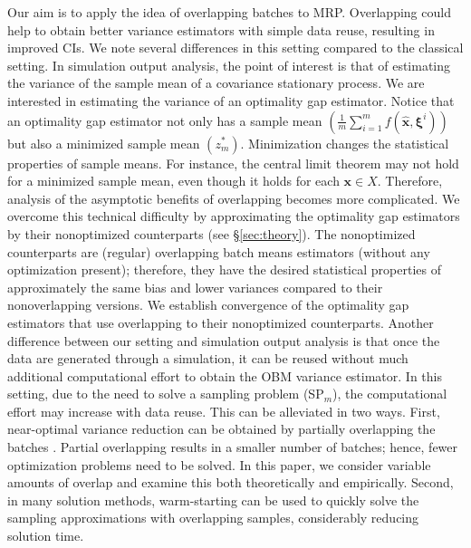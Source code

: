 \documentclass[12pt]{article}
\newcommand{\X}{X}
\newcommand{\x}{\mathbf{x}}
\newcommand{\xh}{{\hat{\x}}}
\newcommand{\xit}{\boldsymbol{\xi}}
\newcommand{\xiti}{\xit^i}
\newcommand{\zs}{z^*}
\begin{document}
Our aim is to apply the idea of overlapping batches to MRP.  
Overlapping could help to obtain better variance estimators with simple data reuse, resulting in improved CIs.
We note several differences in this setting compared to the classical setting.  
In simulation output analysis, the point of interest is that of estimating the variance of the sample mean of a covariance stationary process.  
We are interested in estimating the variance of an optimality gap estimator.  
Notice that an optimality gap estimator not only has a sample mean $(\frac{1}{m} \sum_{i=1}^m f(\xh,\xiti))$ but also a minimized sample mean $(\zs_m)$.  
Minimization changes the statistical properties of sample means.  
For instance, the central limit theorem may not hold for a minimized sample mean, even though it holds for each $\x \in \X$.  
Therefore, analysis of the asymptotic benefits of overlapping becomes more complicated.
We overcome this technical difficulty by approximating the optimality gap estimators by their nonoptimized counterparts (see \S \ref{sec:theory}).  
The nonoptimized counterparts are (regular) overlapping batch means estimators (without any optimization present); therefore, they have the desired statistical properties of approximately the same bias and lower variances compared to their nonoverlapping versions. 
We establish convergence of the optimality gap estimators that use overlapping to their nonoptimized counterparts. 
Another difference between our setting and simulation output analysis is that once the data are generated through a simulation, it can be reused without much additional computational effort to obtain the OBM variance estimator.  
In this setting, due to the need to solve a sampling problem (SP$_m$), the computational effort may increase with data reuse.  
This can be alleviated in two ways. 
First, near-optimal variance reduction can be obtained by partially overlapping the batches \citep{Welch1987,Song1992}.  
Partial overlapping results in a smaller number of batches; hence, fewer optimization problems need to be solved.
In this paper, we consider variable amounts of overlap and examine this both theoretically and empirically. 
Second, in many solution methods, warm-starting can be used to quickly solve the sampling approximations with overlapping samples, considerably reducing solution time.




\end{document}

